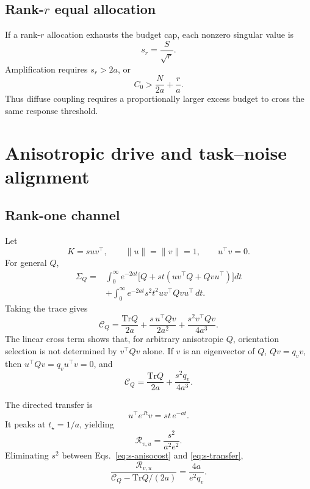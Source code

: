 \documentclass[
  aps,prl,preprint,notitlepage,superscriptaddress,nofootinbib,longbibliography,
  amsmath,amssymb
]{revtex4-2}
\newcommand{\Tr}{\mathrm{Tr}}
\newcommand{\Rtask}{\mathcal{R}}
\newcommand{\Cnoise}{\mathcal{C}}
\begin{document}
\subsection{Rank-\texorpdfstring{$r$}{r} equal allocation}

If a rank-$r$ allocation exhausts the budget cap, each nonzero singular value is
\begin{equation}
s_r=\frac{S}{\sqrt r}.
\end{equation}
Amplification requires $s_r>2a$, or
\begin{equation}
C_0>\frac{N}{2a}+\frac{r}{a}.
\end{equation}
Thus diffuse coupling requires a proportionally larger excess budget to cross
the same response threshold.

\section{Anisotropic drive and task--noise alignment}
\label{sec:s-aniso}

\subsection{Rank-one channel}

Let
\begin{equation}
K=suv^\top,\qquad \|u\|=\|v\|=1,\qquad u^\top v=0.
\end{equation}
For general $Q$,
\begin{align}
\Sigma_Q
={}&\int_0^\infty e^{-2at}
\bigl[Q+st(uv^\top Q+Qvu^\top)\bigr]dt\nonumber\\
&+\int_0^\infty e^{-2at}s^2t^2uv^\top Qvu^\top\,dt .
\end{align}
Taking the trace gives
\begin{equation}
\Cnoise_Q
=\frac{\Tr Q}{2a}
+\frac{s\,u^\top Qv}{2a^2}
+\frac{s^2v^\top Qv}{4a^3}.
\label{eq:s-generalQ}
\end{equation}
The linear cross term shows that, for arbitrary anisotropic $Q$, orientation
selection is not determined by $v^\top Qv$ alone. If $v$ is an eigenvector of
$Q$, $Qv=q_vv$, then
$u^\top Qv=q_vu^\top v=0$, and
\begin{equation}
\Cnoise_Q
=\frac{\Tr Q}{2a}+\frac{s^2q_v}{4a^3}.
\label{eq:s-anisocost}
\end{equation}

The directed transfer is
\begin{equation}
u^\top e^{Jt}v=st\,e^{-at}.
\end{equation}
It peaks at $t_\star=1/a$, yielding
\begin{equation}
\Rtask_{v,u}
=\frac{s^2}{a^2e^2}.
\label{eq:s-transfer}
\end{equation}
Eliminating $s^2$ between Eqs.~\eqref{eq:s-anisocost} and
\eqref{eq:s-transfer},
\begin{equation}
\frac{\Rtask_{v,u}}
{\Cnoise_Q-\Tr Q/(2a)}
=\frac{4a}{e^2q_v}.
\label{eq:s-efficiency}
\end{equation}
\end{document}
